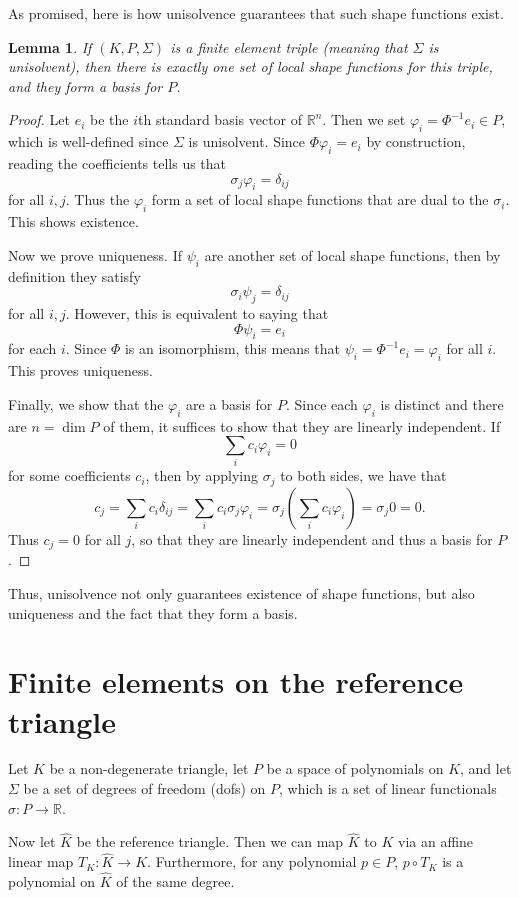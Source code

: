 \documentclass{article}
\theoremstyle{plain}
\newtheorem{lemma}{Lemma}
\theoremstyle{definition}
\theoremstyle{remark}
\begin{document}
As promised, here is how unisolvence guarantees that such shape functions exist.
\begin{lemma}
	If $(K, P, \Sigma)$ is a finite element triple (meaning that $\Sigma$ is unisolvent), then there is exactly one set of local shape functions for this triple, and they form a basis for $P$.
\end{lemma}
\begin{proof}
	Let $e_i$ be the $i$th standard basis vector of $\mathbb R^n$.
	Then we set $\varphi_i = \Phi^{-1}e_i \in P$, which is well-defined since $\Sigma$ is unisolvent.
	Since $\Phi\varphi_i = e_i$ by construction, reading the coefficients tells us that \[\sigma_j\varphi_i = \delta_{ij}\] for all $i,j$.
	Thus the $\varphi_i$ form a set of local shape functions that are dual to the $\sigma_i$.
	This shows existence.

	Now we prove uniqueness.
	If $\psi_i$ are another set of local shape functions, then by definition they satisfy \[\sigma_i\psi_j = \delta_{ij}\] for all $i,j$.
	However, this is equivalent to saying that \[\Phi\psi_i = e_i\] for each $i$.
	Since $\Phi$ is an isomorphism, this means that $\psi_i = \Phi^{-1}e_i = \varphi_i$ for all $i$.
	This proves uniqueness.

	Finally, we show that the $\varphi_i$ are a basis for $P$.
	Since each $\varphi_i$ is distinct and there are $n = \dim P$ of them, it suffices to show that they are linearly independent.
	If \[\sum_ic_i\varphi_i = 0\] for some coefficients $c_i$, then by applying $\sigma_j$ to both sides, we have that \[c_j = \sum_ic_i\delta_{ij} = \sum_ic_i\sigma_j\varphi_i = \sigma_j(\sum_ic_i\varphi_i) = \sigma_j 0 = 0.\]
	Thus $c_j = 0$ for all $j$, so that they are linearly independent and thus a basis for $P$.
\end{proof}

Thus, unisolvence not only guarantees existence of shape functions, but also uniqueness and the fact that they form a basis.

\section{Finite elements on the reference triangle}\label{app:tri}
Let $K$ be a non-degenerate triangle, let $P$ be a space of polynomials on $K$, and let $\Sigma$ be a set of degrees of freedom (dofs) on $P$, which is a set of linear functionals $\sigma : P \to \mathbb R$.

Now let $\widehat K$ be the reference triangle.
Then we can map $\widehat K$ to $K$ via an affine linear map $T_K : \widehat K \to K$.
Furthermore, for any polynomial $p \in P$, $p \circ T_K$ is a polynomial on $\widehat K$ of the same degree.
\end{document}
